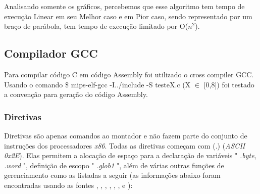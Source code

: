 \documentclass[12pt]{article}
\begin{document}
Analisando somente os gráficos, percebemos que esse algoritmo tem tempo de execução Linear em seu Melhor caso e em Pior caso, sendo representado por um braço de parábola, tem tempo de execução limitado por O(\(n^2\)). 

\subsection{Compilador GCC}
\label{subsec:comp}

Para compilar código C em código Assembly foi utilizado o cross compiler \cite{MIPS} GCC. Usando o comando \$ mips-elf-gcc -I../include -S testeX.c (X $\in$ [0,8]) foi testado a convenção para geração do código Assembly.

\subsubsection{Diretivas}
\label{subsubsec:diretivas}

Diretivas são apenas comandos ao montador e não fazem parte do conjunto de instruções dos processadores \textit{x86}. Todas as diretivas começam com (.) (\textit{ASCII 0x2E}). Elas permitem a alocação de espaço para a declaração de variáveis " \textit{.byte}, \textit{.word} ", definição de escopo " \textit{.glob1} ", além de várias outras funções de gerenciamento como as listadas a seguir (as informações abaixo foram encontradas usando as fontes \cite{mips1}, \cite{mips2-1}, \cite{mips2-2}, \cite{mips2-3}, \cite{mips3}, 
\cite{mips4}, \cite{mips5} e \cite{mips6} ):
\end{document}
